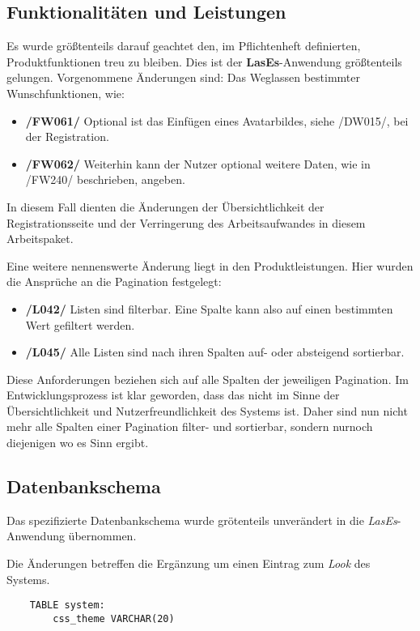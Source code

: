 \subsection{Funktionalitäten und Leistungen}

Es wurde größtenteils darauf geachtet den, im Pflichtenheft definierten, Produktfunktionen treu zu bleiben.
Dies ist der \textbf{LasEs}-Anwendung größtenteils gelungen.
Vorgenommene Änderungen sind:
\newline
Das Weglassen bestimmter Wunschfunktionen, wie:
\begin{itemize}
    \item \textbf{/FW061/} Optional ist das Einfügen eines Avatarbildes, siehe /DW015/, bei der Registration.
    \item \textbf{/FW062/} Weiterhin kann der Nutzer optional weitere Daten, wie in /FW240/ beschrieben, angeben.
\end{itemize}
In diesem Fall dienten die Änderungen der Übersichtlichkeit der Registrationsseite und der
Verringerung des Arbeitsaufwandes in diesem Arbeitspaket.

\newline
Eine weitere nennenswerte Änderung liegt in den Produktleistungen.
Hier wurden die Ansprüche an die Pagination festgelegt:
\begin{itemize}
    \item \textbf{/L042/} Listen sind filterbar.
    Eine Spalte kann also auf einen bestimmten Wert gefiltert werden.
    \item \textbf{/L045/} Alle Listen sind nach ihren Spalten auf- oder absteigend sortierbar.
\end{itemize}
Diese Anforderungen beziehen sich auf alle Spalten der jeweiligen Pagination.
Im Entwicklungsprozess ist klar geworden, dass das nicht im Sinne der Übersichtlichkeit
und Nutzerfreundlichkeit des Systems ist.
Daher sind nun nicht mehr alle Spalten einer Pagination filter- und sortierbar,
sondern nurnoch diejenigen wo es Sinn ergibt.

\subsection{Datenbankschema}
\newline
Das spezifizierte Datenbankschema wurde grötenteils unverändert in die \emph{LasEs}-Anwendung
übernommen.

\newline
Die Änderungen betreffen die Ergänzung um einen Eintrag
zum \emph{Look} des Systems.
\begin{verbatim}
    TABLE system:
        css_theme VARCHAR(20)
\end{verbatim}

